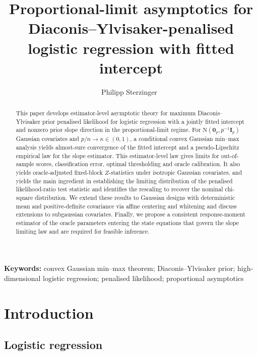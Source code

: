 \documentclass{article}
\author[1]{Philipp Sterzinger~\orcidlink{0009-0007-7348-5810}%
}
\title{Proportional-limit asymptotics for Diaconis--Ylvisaker-penalised logistic regression with fitted intercept}
\theoremstyle{definition}
\newcommand*{\bb}{\boldsymbol}
\begin{document}
\begin{bibunit}

	\maketitle


\begin{abstract}
This paper develops estimator-level asymptotic theory for maximum
Diaconis--Ylvisaker prior penalised likelihood for logistic regression with a 
jointly fitted
intercept and nonzero prior slope direction in the proportional-limit regime.  
For $\mathrm{N}(\bb{0}_p, p^{-1}\bb I_p)$ Gaussian covariates and
$p/n\to\kappa\in(0,1)$, a conditional convex Gaussian min--max analysis yields almost-sure
convergence of the fitted intercept and a pseudo-Lipschitz empirical law for
the slope estimator. 
This estimator-level law gives limits for out-of-sample scores, classification error, optimal
thresholding and oracle calibration. 
It also yields oracle-adjusted
fixed-block $Z$-statistics under isotropic Gaussian covariates, and 
yields the main ingredient in establishing the limiting distribution of the 
penalised likelihood-ratio test statistic and identifies the rescaling to 
recover the nominal chi-square distribution.
We extend these results to Gaussian designs with deterministic mean and
positive-definite covariance via affine centering
and whitening and discuss extensions to subgaussian covariates. 
Finally, we propose a consistent response-moment estimator of the oracle parameters entering the state equations that govern the slope limiting law and are required for feasible inference.
\end{abstract}


\noindent\textbf{Keywords:} convex Gaussian min--max theorem; Diaconis--Ylvisaker prior; high-dimensional logistic regression; penalised likelihood; proportional asymptotics


\section{Introduction}
\label{sec:introduction}

\subsection{Logistic regression}
\label{subsec:logistic-regression}


\end{bibunit}
\end{document}
